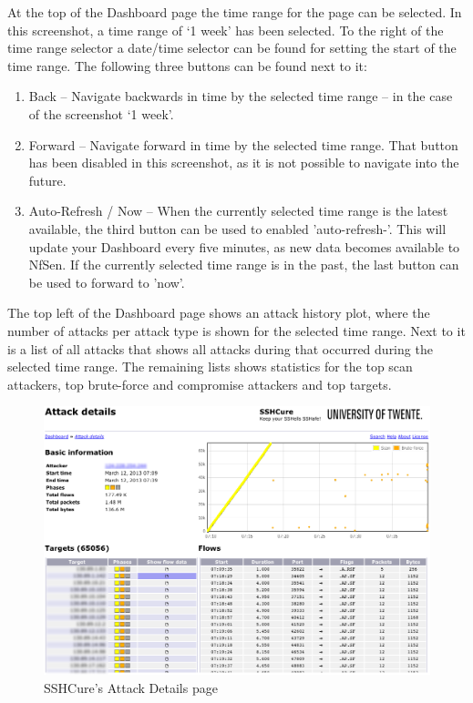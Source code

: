 At the top of the Dashboard page the time range for the page can be selected. In this screenshot, a time range of `1 week' has been selected. To the right of the time range selector a date/time selector can be found for setting the start of the time range. The following three buttons can be found next to it:

\begin{enumerate}
	\item Back -- Navigate backwards in time by the selected time range -- in the case of the screenshot `1 week'.
	\item Forward -- Navigate forward in time by the selected time range. That button has been disabled in this screenshot, as it is not possible to navigate into the future.
	\item Auto-Refresh / Now -- When the currently selected time range is the latest available, the third button can be used to enabled 'auto-refresh-'. This will update your Dashboard every five minutes, as new data becomes available to NfSen. If the currently selected time range is in the past, the last button can be used to forward to 'now'.
\end{enumerate}

The top left of the Dashboard page shows an attack history plot, where the number of attacks per attack type is shown for the selected time range. Next to it is a list of all attacks that shows all attacks during that occurred during the selected time range. The remaining lists shows statistics for the top scan attackers, top brute-force and compromise attackers and top targets.

\newpage

\begin{figure}[!ht]
	\centering
    	\includegraphics[width=\textwidth]{img/Screenshot_AttackDetails_anonymized.png}
	\caption{SSHCure's Attack Details page}
	\label{fig:screenshot_AttackDetails}
\end{figure}

